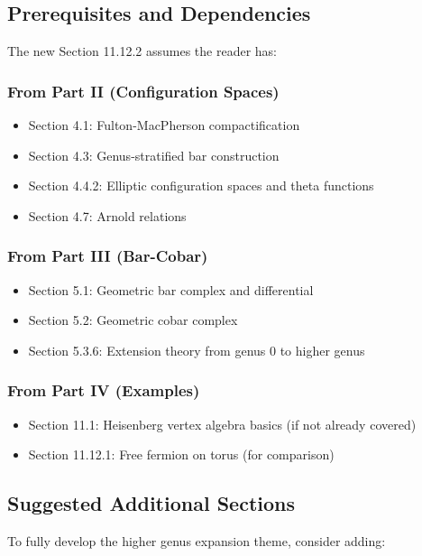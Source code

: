 \subsection{Prerequisites and Dependencies}

The new Section 11.12.2 assumes the reader has:

\subsubsection{From Part II (Configuration Spaces)}
\begin{itemize}
\item Section 4.1: Fulton-MacPherson compactification
\item Section 4.3: Genus-stratified bar construction
\item Section 4.4.2: Elliptic configuration spaces and theta functions
\item Section 4.7: Arnold relations
\end{itemize}

\subsubsection{From Part III (Bar-Cobar)}
\begin{itemize}
\item Section 5.1: Geometric bar complex and differential
\item Section 5.2: Geometric cobar complex
\item Section 5.3.6: Extension theory from genus 0 to higher genus
\end{itemize}

\subsubsection{From Part IV (Examples)}
\begin{itemize}
\item Section 11.1: Heisenberg vertex algebra basics (if not already covered)
\item Section 11.12.1: Free fermion on torus (for comparison)
\end{itemize}

\subsection{Suggested Additional Sections}

To fully develop the higher genus expansion theme, consider adding:

